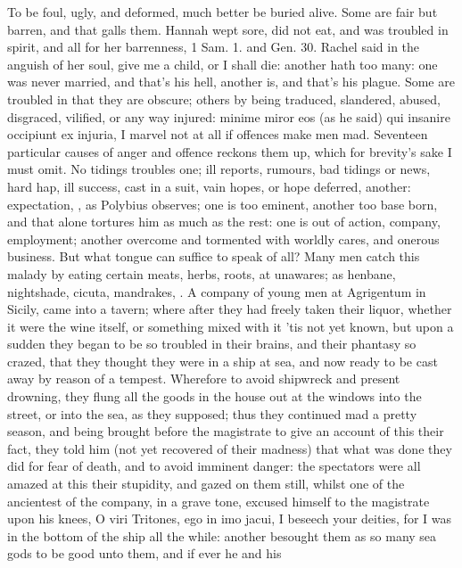 {To be foul, ugly, and deformed, much better be buried alive. Some are
fair but barren, and that galls them. Hannah wept sore, did not eat,
and was troubled in spirit, and all for her barrenness, 1 Sam. 1. and
Gen. 30. Rachel said in the anguish of her soul, give me a child, or I
shall die: another hath too many: one was never married, and that's his
hell, another is, and that's his plague. Some are troubled in that they
are obscure; others by being traduced, slandered, abused, disgraced,
vilified, or any way injured: minime miror eos (as he said) qui
insanire occipiunt ex injuria, I marvel not at all if offences make men
mad. Seventeen particular causes of anger and offence \Aristotle reckons
them up, which for brevity's sake I must omit. No tidings troubles one;
ill reports, rumours, bad tidings or news, hard hap, ill success, cast
in a suit, vain hopes, or hope deferred, another: expectation, , as Polybius
observes; one is too eminent, another too base born, and that alone
tortures him as much as the rest: one is out of action, company,
employment; another overcome and tormented with worldly cares, and
onerous business. But what tongue can suffice to speak of all?
Many men catch this malady by eating certain meats, herbs, roots, at
unawares; as henbane, nightshade, cicuta, mandrakes, \etc{}. A
company of young men at Agrigentum in Sicily, came into a tavern; where
after they had freely taken their liquor, whether it were the wine
itself, or something mixed with it 'tis not yet known, but upon a
sudden they began to be so troubled in their brains, and their phantasy
so crazed, that they thought they were in a ship at sea, and now ready
to be cast away by reason of a tempest. Wherefore to avoid shipwreck
and present drowning, they flung all the goods in the house out at the
windows into the street, or into the sea, as they supposed; thus they
continued mad a pretty season, and being brought before the magistrate
to give an account of this their fact, they told him (not yet recovered
of their madness) that what was done they did for fear of death, and to
avoid imminent danger: the spectators were all amazed at this their
stupidity, and gazed on them still, whilst one of the ancientest of the
company, in a grave tone, excused himself to the magistrate upon his
knees, O viri Tritones, ego in imo jacui, I beseech your deities, \etc{}
for I was in the bottom of the ship all the while: another besought
them as so many sea gods to be good unto them, and if ever he and his
}
